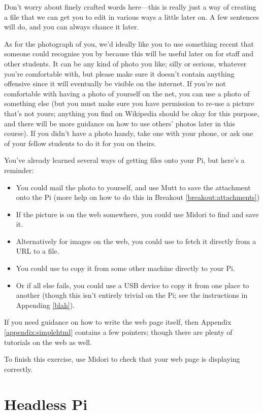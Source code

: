 Don't worry about finely crafted words here---this is really just a way of creating a file that we can get you to edit in various ways a little later on. A few sentences will do, and you can always chance it later. 

As for the photograph of you, we'd ideally like you to use something recent that someone could recognise you by because this will be useful later on for staff and other students. It can be any kind of photo you like; silly or serious, whatever you're comfortable with, but please make sure it doesn't contain anything offensive since it will eventually be visible on the internet. If you're not comfortable with having a photo of yourself on the net, you can use a photo of something else (but you must make sure you have permission to re-use a picture that's not yours; anything you find on Wikipedia should be okay for this purpose, and there will be more guidance on how to use others' photos later in this course). If you didn't have a photo handy, take one with your phone, or ask one of your fellow students to do it for you on theirs.

You've already learned several ways of getting files onto your Pi, but here's a reminder:
\begin{itemize}
\item You could mail the photo to yourself, and use Mutt to save the attachment onto the Pi (more help on how to do this in Breakout \ref{breakout:attachments})
\item If the picture is on the web somewhere, you could use Midori to find and save it. 
\item Alternatively for images on the web, you could use  to fetch it directly from a URL to a file. 
\item You could use  to copy it from some other machine directly to your Pi. 
\item Or if all else fails, you could use a USB device to copy it from one place to another (though this isn't entirely trivial on the Pi; see the instructions in Appending \ref{blah}). 
\end{itemize}

If you need guidance on how to write the web page itself, then Appendix \ref{appendix:simplehtml} contains a few pointers; though there are plenty of tutorials on the web as well. 

To finish this exercise, use Midori to check that your web page is displaying correctly.

\section{Headless Pi}
\label{section:headless}


